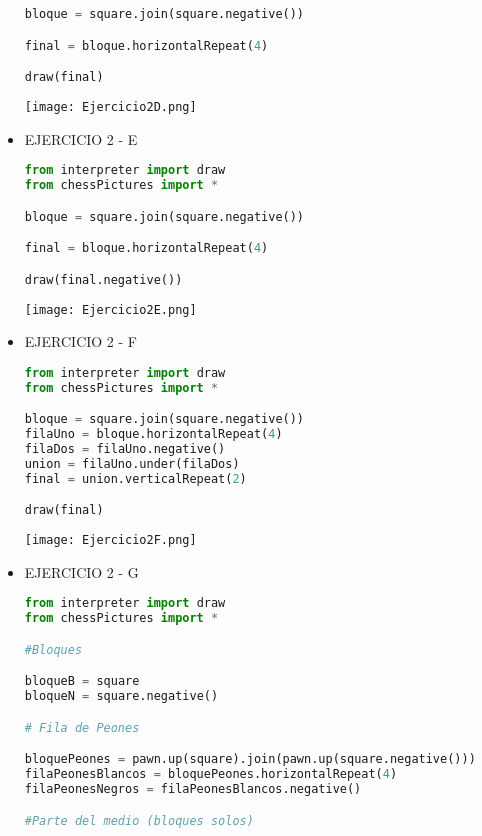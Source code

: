 \documentclass{article}
\begin{document}
\begin{itemize}
\begin{lstlisting}[language=Python, caption=EJERCICIO 2-D]
bloque = square.join(square.negative())

final = bloque.horizontalRepeat(4)

draw(final)
            \end{lstlisting}  
            \texttt{[image: Ejercicio2D.png]}

            \item EJERCICIO 2 - E

            \begin{lstlisting}[language=Python, caption=EJERCICIO 2-E]
from interpreter import draw
from chessPictures import *

bloque = square.join(square.negative())

final = bloque.horizontalRepeat(4)

draw(final.negative())
            \end{lstlisting}  
            \texttt{[image: Ejercicio2E.png]}
            
            \item EJERCICIO 2 - F

            \begin{lstlisting}[language=Python, caption=EJERCICIO 2-F]
from interpreter import draw
from chessPictures import *

bloque = square.join(square.negative())
filaUno = bloque.horizontalRepeat(4)
filaDos = filaUno.negative()
union = filaUno.under(filaDos)
final = union.verticalRepeat(2)

draw(final)
            \end{lstlisting}  
            \texttt{[image: Ejercicio2F.png]}
            
            \item EJERCICIO 2 - G
            
            \begin{lstlisting}[language=Python, caption=EJERCICIO 2-G]
from interpreter import draw
from chessPictures import *

#Bloques

bloqueB = square
bloqueN = square.negative()

# Fila de Peones

bloquePeones = pawn.up(square).join(pawn.up(square.negative()))
filaPeonesBlancos = bloquePeones.horizontalRepeat(4)
filaPeonesNegros = filaPeonesBlancos.negative()

#Parte del medio (bloques solos)


\end{lstlisting}
\end{itemize}
\end{document}
